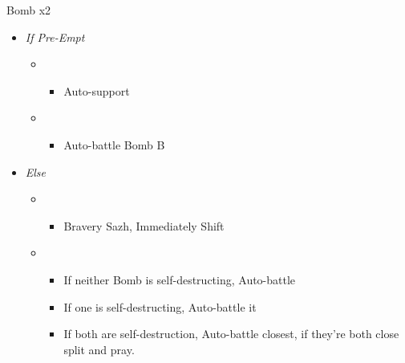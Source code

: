 \begin{multicols}{2}
	\begin{battle}[0:11]{Bomb x2}
		\begin{itemize}
			\item \textit{If Pre-Empt}
			      \begin{itemize}
				      \item \second
				            \begin{itemize}
					            \item Auto-support
				            \end{itemize}
				      \item \first
				            \begin{itemize}
					            \item Auto-battle Bomb B
				            \end{itemize}
			      \end{itemize}
			\item \textit{Else}
			      \begin{itemize}
				      \item \second
				            \begin{itemize}
					            \item Bravery Sazh, Immediately Shift
				            \end{itemize}
				      \item \first
				            \begin{itemize}
					            \item If neither Bomb is self-destructing, Auto-battle
					            \item If one is self-destructing, Auto-battle it
					            \item If both are self-destruction, Auto-battle closest, if they're both close split and pray.
				            \end{itemize}
			      \end{itemize}
		\end{itemize}
	\end{battle}


\end{multicols}
